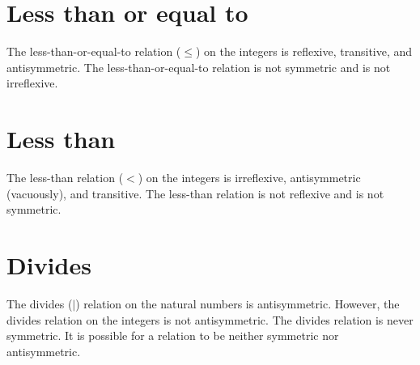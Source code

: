 \documentclass[12pt]{article}
\begin{document}
\section*{Less than or equal to}
The less-than-or-equal-to relation ($\leq$) on the integers is reflexive, transitive, and antisymmetric. The less-than-or-equal-to relation is not symmetric and is not irreflexive.
\section*{Less than}
The less-than relation ($<$) on the integers is irreflexive, antisymmetric (vacuously), and transitive. The less-than relation is not reflexive and is not symmetric.
\section*{Divides}
The divides ($\mid$) relation on the natural numbers is antisymmetric. However, the divides relation on the integers is not antisymmetric. The divides relation is never symmetric. It is possible for a relation to be neither symmetric nor antisymmetric.
\end{document}
